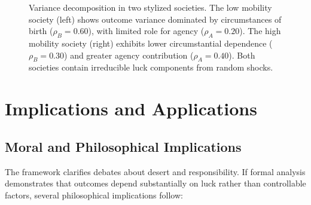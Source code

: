 \begin{figure}[h]
    \caption{Variance decomposition in two stylized societies. The low mobility society (left) shows outcome variance dominated by circumstances of birth ($\rho_B = 0.60$), with limited role for agency ($\rho_A = 0.20$). The high mobility society (right) exhibits lower circumstantial dependence ($\rho_B = 0.30$) and greater agency contribution ($\rho_A = 0.40$). Both societies contain irreducible luck components from random shocks.}
    \label{fig:variance}
  \end{figure}

  \section{Implications and Applications}
  \label{sec:implications}

  \subsection{Moral and Philosophical Implications}

  The framework clarifies debates about desert and responsibility. If formal
  analysis demonstrates that outcomes depend substantially on luck rather
  than controllable factors, several philosophical implications follow:

